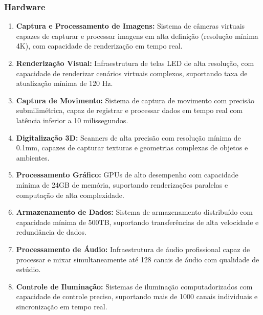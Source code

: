 \subsubsection{Hardware}
\begin{enumerate}[leftmargin=*]
    \item \textbf{Captura e Processamento de Imagens:} Sistema de câmeras virtuais capazes de capturar e processar imagens em alta definição (resolução mínima 4K), com capacidade de renderização em tempo real.
    \item \textbf{Renderização Visual:} Infraestrutura de telas LED de alta resolução, com capacidade de renderizar cenários virtuais complexos, suportando taxa de atualização mínima de 120 Hz.
    \item \textbf{Captura de Movimento:} Sistema de captura de movimento com precisão submilimétrica, capaz de registrar e processar dados em tempo real com latência inferior a 10 milissegundos.
    \item \textbf{Digitalização 3D:} Scanners de alta precisão com resolução mínima de 0.1mm, capazes de capturar texturas e geometrias complexas de objetos e ambientes.
    \item \textbf{Processamento Gráfico:} GPUs de alto desempenho com capacidade mínima de 24GB de memória, suportando renderizações paralelas e computação de alta complexidade.
    \item \textbf{Armazenamento de Dados:} Sistema de armazenamento distribuído com capacidade mínima de 500TB, suportando transferências de alta velocidade e redundância de dados.
    \item \textbf{Processamento de Áudio:} Infraestrutura de áudio profissional capaz de processar e mixar simultaneamente até 128 canais de áudio com qualidade de estúdio.
    \item \textbf{Controle de Iluminação:} Sistemas de iluminação computadorizados com capacidade de controle preciso, suportando mais de 1000 canais individuais e sincronização em tempo real.
\end{enumerate}

